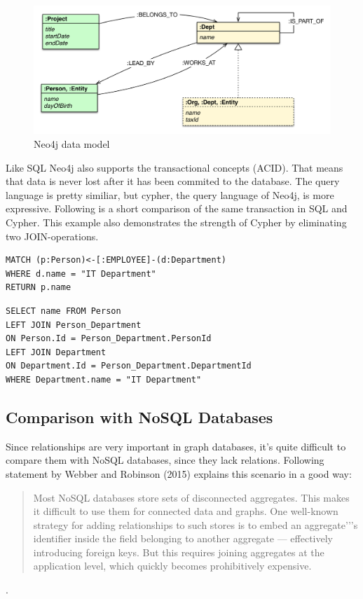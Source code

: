 \begin{figure}[H]
	\includegraphics[width=\linewidth,keepaspectratio]{images/neo4j/organization_graph.png}
	\caption{Neo4j data model}
\end{figure}

Like SQL Neo4j also supports the transactional concepts (ACID). That means that data is never lost after it has been commited to the database.
The query language is pretty similiar, but cypher, the query language of Neo4j, is more expressive.
Following is a short comparison of the same transaction in SQL and Cypher. This example also demonstrates the strength of Cypher by eliminating two JOIN-operations. \cite["Working with Neo4j", para. 1]{NeoTechnologyInc.2017g}

\begin{lstlisting}[frame=single, caption=Cypher Statement, label=gcystm]
MATCH (p:Person)<-[:EMPLOYEE]-(d:Department)
WHERE d.name = "IT Department"
RETURN p.name
\end{lstlisting}

\begin{lstlisting}[frame=single, caption=SQL Statement, label=gsqlstm]
SELECT name FROM Person
LEFT JOIN Person_Department
ON Person.Id = Person_Department.PersonId
LEFT JOIN Department
ON Department.Id = Person_Department.DepartmentId
WHERE Department.name = "IT Department"
\end{lstlisting}

\subsection{Comparison with NoSQL Databases}

Since relationships are very important in graph databases, it's quite difficult to compare them with NoSQL databases, since they lack relations. Following statement by Webber and Robinson (2015) explains this scenario in a good way:
\begin{quotation}
	Most NoSQL databases store sets of disconnected aggregates. This makes it difficult to use them for connected data and graphs.
	One well-known strategy for adding relationships to such stores is to embed an aggregate'’'s identifier inside the field belonging to another aggregate — effectively introducing foreign keys.
	But this requires joining aggregates at the application level, which quickly becomes prohibitively expensive.
\end{quotation} \cite[p. 15]{Webber.Robinson.2015}.

